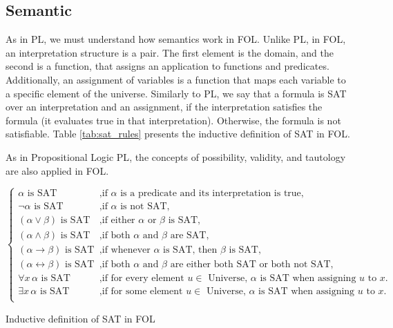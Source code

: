 \subsection{Semantic}
As in \gls{PL}, we must understand how semantics work in \gls{FOL}. Unlike \gls{PL}, in \gls{FOL}, an interpretation structure is a pair. The first element is the domain, and the second is a function, that assigns an application to functions and predicates. Additionally, an assignment of variables is a function that maps each variable to a specific element of the universe. Similarly to \gls{PL}, we say that a formula is SAT over an interpretation and an assignment, if the interpretation satisfies the formula (it evaluates true in that interpretation). Otherwise, the formula is not satisfiable. Table \ref{tab:sat_rules} presents the inductive definition of SAT in \gls{FOL}.

As in Propositional Logic \gls{PL}, the concepts of possibility, validity, and tautology are also applied in \gls{FOL}.

\begin{table}[h]
\[
    \left\{
    \begin{array}{ll}
        \alpha \text{ is SAT}  & \text{,if } \alpha \text{ is a predicate and its interpretation is true}, \\
        \neg \alpha \text{ is SAT} & \text{,if } \alpha \text{ is not SAT,} \\
        (\alpha \lor \beta) \text{ is SAT} & \text{,if either } \alpha \text{ or } \beta \text{ is SAT,} \\
        (\alpha \land \beta) \text{ is SAT} & \text{,if both } \alpha \text{ and } \beta \text{ are SAT,} \\
        (\alpha \rightarrow \beta) \text{ is SAT} & \text{,if whenever } \alpha \text{ is SAT, then } \beta \text{ is SAT,} \\
        (\alpha \leftrightarrow \beta) \text{ is SAT} & \text{,if both } \alpha \text{ and } \beta \text{ are either both SAT or both not SAT,} \\
        \forall x \, \alpha \text{ is SAT} & \text{,if for every element } u \in \text{ Universe, } \alpha \text{ is SAT when assigning } u \text{ to } x. \\
        \exists x \, \alpha \text{ is SAT} & \text{,if for some element } u \in \text{ Universe, } \alpha \text{ is SAT when assigning } u \text{ to } x. \\
    \end{array}
    \right.
\]


    \caption{Inductive definition of SAT in \gls{FOL}}
    \label{tab:sat_rules}
    \end{table}

